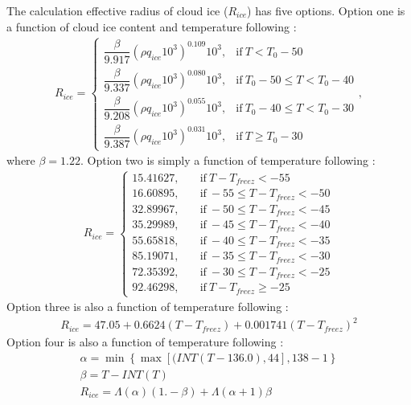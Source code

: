 \documentclass[letterpaper,titlepage,10pt]{article}
\numberwithin{equation}{section}
\begin{document}
The calculation effective radius of cloud ice ($R_{ice}$) has five options. Option one is a function of cloud ice content and temperature following \citet{heymsfield1996high}:
\begin{align}
	R_{ice} =
	\begin{cases}
		\dfrac{\beta}{9.917} \left(\rho q_{ice} 10^3 \right)^{0.109} 10^3, & \text{if}\ T < T_0 - 50 \\[1em]
		\dfrac{\beta}{9.337} \left(\rho q_{ice} 10^3 \right)^{0.080} 10^3, & \text{if}\ T_0 - 50 \leq T < T_0 - 40 \\[1em]
		\dfrac{\beta}{9.208} \left(\rho q_{ice} 10^3 \right)^{0.055} 10^3, & \text{if}\ T_0 - 40 \leq T < T_0 - 30 \\[1em]
		\dfrac{\beta}{9.387} \left(\rho q_{ice} 10^3 \right)^{0.031} 10^3, & \text{if}\ T \geq T_0 - 30
	\end{cases},
\end{align}
where $\beta = 1.22$. Option two is simply a function of temperature following \citet{donner1997larg}:
\begin{align}
	R_{ice} =
	\begin{cases}
		15.41627, & \quad \text{if} \ T - T_{freez} < -55 \\
		16.60895, & \quad \text{if} \ -55 \leq T - T_{freez} < -50 \\
		32.89967, & \quad \text{if} \ -50 \leq T - T_{freez} < -45 \\
		35.29989, & \quad \text{if} \ -45 \leq T - T_{freez} < -40 \\
		55.65818, & \quad \text{if} \ -40 \leq T - T_{freez} < -35 \\
		85.19071, & \quad \text{if} \ -35 \leq T - T_{freez} < -30 \\
		72.35392, & \quad \text{if} \ -30 \leq T - T_{freez} < -25 \\
		92.46298, & \quad \text{if} \ T - T_{freez} \ge -25
	\end{cases}
\end{align}
Option three is also a function of temperature following \citet{fu2007anew}:
\begin{gather}
	R_{ice} = 47.05 + 0.6624 \left(T - T_{freez} \right) + 0.001741 \left(T - T_{freez} \right)^2
\end{gather}
Option four is also a function of temperature following \citet{kristjansson2000impa}:
\begin{gather}
	\alpha = \min \left\{ \max \left[(INT \left(T - 136.0 \right), 44 \right], 138 - 1 \right\} \\
	\beta = T - INT(T) \\
	R_{ice} = \Lambda(\alpha) \left(1. - \beta \right) + \Lambda \left(\alpha + 1 \right) \beta
\end{gather}
\end{document}
